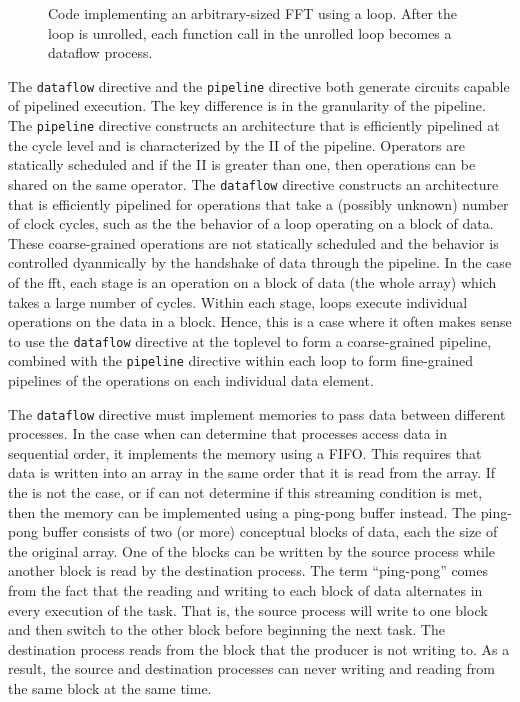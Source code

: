 \begin{figure}

\caption{Code implementing an arbitrary-sized FFT using a loop. After the loop is unrolled, each function call in the unrolled loop becomes a dataflow process. }
\label{fig:fft_stages_loop_code}
\end{figure}

The \lstinline{dataflow} directive and the \lstinline{pipeline} directive both generate circuits capable of pipelined execution.  The key difference is in the granularity of the pipeline. The \lstinline{pipeline} directive constructs an architecture that is efficiently pipelined at the cycle level and is characterized by the II of the pipeline.  Operators are statically scheduled and if the II is greater than one, then operations can be shared on the same operator.  The \lstinline{dataflow} directive constructs an architecture that is efficiently pipelined for operations that take a (possibly unknown) number of clock cycles, such as the the behavior of a loop operating on a block of data.  These coarse-grained operations are not statically scheduled and the behavior is controlled dyanmically by the handshake of data through the pipeline.  In the case of the \gls{fft}, each stage is an operation on a block of data (the whole array) which takes a large number of cycles.  Within each stage, loops execute individual operations on the data in a block.  Hence, this is a case where it often makes sense to use the \lstinline|dataflow| directive at the toplevel to form a coarse-grained pipeline, combined with the \lstinline|pipeline| directive within each loop to form fine-grained pipelines of the operations on each individual data element.

The \lstinline{dataflow} directive must implement memories to pass data between different processes. In the case when \VHLS can determine that processes access data in sequential order, it implements the memory using a FIFO. This requires that data is written into an array in the same order that it is read from the array.  If the is not the case, or if \VHLS can not determine if this streaming condition is met, then the memory can be implemented using a ping-pong buffer instead.   The ping-pong buffer consists of two (or more) conceptual blocks of data, each the size of the original array. One of the blocks can be written by the source process while another block is read by the destination process. The term ``ping-pong'' comes from the fact that the reading and writing to each block of data alternates in every execution of the task. That is, the source process will write to one block and then switch to the other block before beginning the next task. The destination process reads from the block that the producer is not writing to. As a result, the source and destination processes can never writing and reading from the same block at the same time. 

